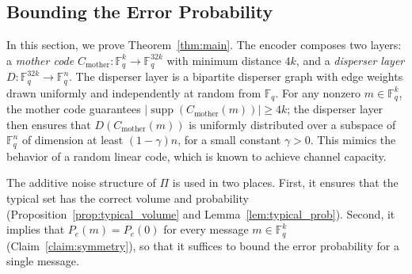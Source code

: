 \documentclass[11pt]{article}
\DeclareMathOperator{\supp}{supp}
\newcommand{\basecode}{C_{\text{mother}}}
\theoremstyle{named}
\begin{document}
\subsection{Bounding the Error Probability}

In this section, we prove Theorem~\ref{thm:main}. The encoder composes two layers: a \emph{mother code} $\basecode: \mathbb{F}_q^k \to \mathbb{F}_q^{32k}$ with minimum distance $4k$, and a \emph{disperser layer} $D: \mathbb{F}_q^{32k} \to \mathbb{F}_q^n$. The disperser layer is a bipartite disperser graph with edge weights drawn uniformly and independently at random from $\mathbb{F}_q$.
For any nonzero $m \in \mathbb{F}_q^k$, the mother code guarantees $|\supp(\basecode(m))| \ge 4k$; the disperser layer then ensures that $D(\basecode(m))$ is uniformly distributed over a subspace of $\mathbb{F}_q^n$ of dimension at least $(1-\gamma)n$, for a small constant $\gamma > 0$. This mimics the behavior of a random linear code, which is known to achieve channel capacity.

The additive noise structure of $\Pi$ is used in two places. First, it 
ensures that the typical set has the correct volume and probability 
(Proposition~\ref{prop:typical_volume} and Lemma~\ref{lem:typical_prob}). 
Second, it implies that $P_e(m) = P_e(0)$ for every message $m \in 
\mathbb{F}_q^k$ (Claim~\ref{claim:symmetry}), so that it suffices to 
bound the error probability for a single message.
\end{document}
